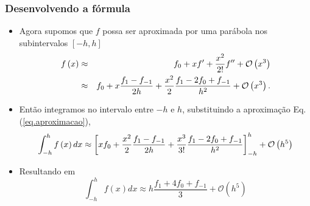 \documentclass[xcolor=table]{beamer}
\newenvironment{stepitemize}{\begin{itemize}[<+->]}{\end{itemize} }
\begin{document}
\begin{frame}%

\frametitle{Desenvolvendo a f\'{o}rmula}

\begin{stepitemize}
\item Agora supomos que $f$ possa ser aproximada por uma par\'{a}bola nos
subintervalos $[-h,h]$%
\begin{eqnarray}
f\left( x\right)  &\approx &f_{0}+xf^{\prime }+\frac{x^{2}}{2!}f^{\prime
\prime }+\mathcal{O}\left( x^{3}\right) \nonumber  \label{eq.aproximacao} \\
&\approx&f_{0}+x\frac{f_{1}-f_{-1}}{2h}+\frac{x^{2}}{2}\frac{f_{1}-2f_{0}+f_{-1}}{%
h^{2}}+\mathcal{O}\left( x^{3}\right)  .
\end{eqnarray}

\item Ent\~{a}o integramos no intervalo entre $-h$ e $h$, substituindo a
aproxima\c{c}\~{a}o Eq.(\ref{eq.aproximacao}),%
\[
\int_{-h}^{h}f\left( x\right) dx\approx \left[ xf_{0}+\frac{x^{2}}{2}\frac{%
f_{1}-f_{-1}}{2h}+\frac{x^{3}}{3!}\frac{f_{1}-2f_{0}+f_{-1}}{h^{2}}\right]
_{-h}^{h}+\mathcal{O}\left( h^{5}\right) 
\]

\item Resultando em%
\begin{equation}
\int_{-h}^{h}f\left( x\right) dx\approx h\frac{f_{1}+4f_{0}+f_{-1}}{3}%
+\mathcal{O}\left( h^{5}\right)   \label{eq.simpson1.3}
\end{equation}
\end{stepitemize}

\transboxout%
\end{frame}%
\end{document}
